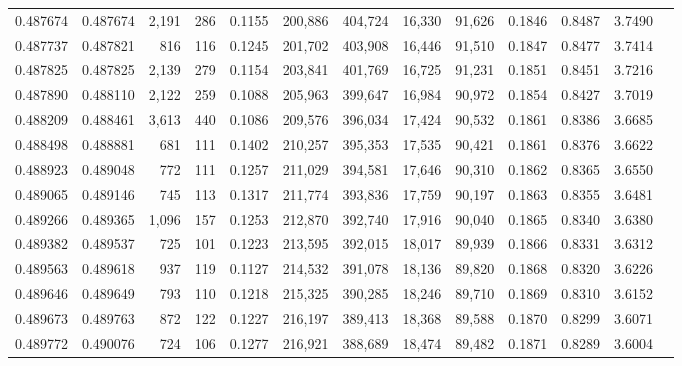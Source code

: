 \begin{tabular}{rrrrrrrrrrrrr}
0.487674 & 0.487674 & 2,191 &   286 &                                     0.1155 & 200,886 & 404,724 &  16,330 &  91,626 & 0.1846 & 0.8487 & 3.7490 \\
0.487737 & 0.487821 &   816 &   116 &                                     0.1245 & 201,702 & 403,908 &  16,446 &  91,510 & 0.1847 & 0.8477 & 3.7414 \\
0.487825 & 0.487825 & 2,139 &   279 &                                     0.1154 & 203,841 & 401,769 &  16,725 &  91,231 & 0.1851 & 0.8451 & 3.7216 \\
0.487890 & 0.488110 & 2,122 &   259 &                                     0.1088 & 205,963 & 399,647 &  16,984 &  90,972 & 0.1854 & 0.8427 & 3.7019 \\
0.488209 & 0.488461 & 3,613 &   440 &                                     0.1086 & 209,576 & 396,034 &  17,424 &  90,532 & 0.1861 & 0.8386 & 3.6685 \\
0.488498 & 0.488881 &   681 &   111 &                                     0.1402 & 210,257 & 395,353 &  17,535 &  90,421 & 0.1861 & 0.8376 & 3.6622 \\
0.488923 & 0.489048 &   772 &   111 &                                     0.1257 & 211,029 & 394,581 &  17,646 &  90,310 & 0.1862 & 0.8365 & 3.6550 \\
0.489065 & 0.489146 &   745 &   113 &                                     0.1317 & 211,774 & 393,836 &  17,759 &  90,197 & 0.1863 & 0.8355 & 3.6481 \\
0.489266 & 0.489365 & 1,096 &   157 &                                     0.1253 & 212,870 & 392,740 &  17,916 &  90,040 & 0.1865 & 0.8340 & 3.6380 \\
0.489382 & 0.489537 &   725 &   101 &                                     0.1223 & 213,595 & 392,015 &  18,017 &  89,939 & 0.1866 & 0.8331 & 3.6312 \\
0.489563 & 0.489618 &   937 &   119 &                                     0.1127 & 214,532 & 391,078 &  18,136 &  89,820 & 0.1868 & 0.8320 & 3.6226 \\
0.489646 & 0.489649 &   793 &   110 &                                     0.1218 & 215,325 & 390,285 &  18,246 &  89,710 & 0.1869 & 0.8310 & 3.6152 \\
0.489673 & 0.489763 &   872 &   122 &                                     0.1227 & 216,197 & 389,413 &  18,368 &  89,588 & 0.1870 & 0.8299 & 3.6071 \\
0.489772 & 0.490076 &   724 &   106 &                                     0.1277 & 216,921 & 388,689 &  18,474 &  89,482 & 0.1871 & 0.8289 & 3.6004 \\

\end{tabular}
